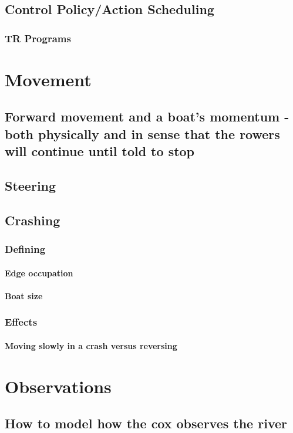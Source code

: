    \subsection{Control Policy/Action Scheduling}
      \subsubsection{TR Programs}
    
  \section{Movement}
    \subsection{Forward movement and a boat's momentum - both physically and in sense that the rowers will continue until told to stop}
    \subsection{Steering}
    \subsection{Crashing}
      \subsubsection{Defining}
        \paragraph{Edge occupation}
        \paragraph{Boat size}
      \subsubsection{Effects}
        \paragraph{Moving slowly in a crash versus reversing}
  
  \section{Observations}
    \subsection{How to model how the cox observes the river}
